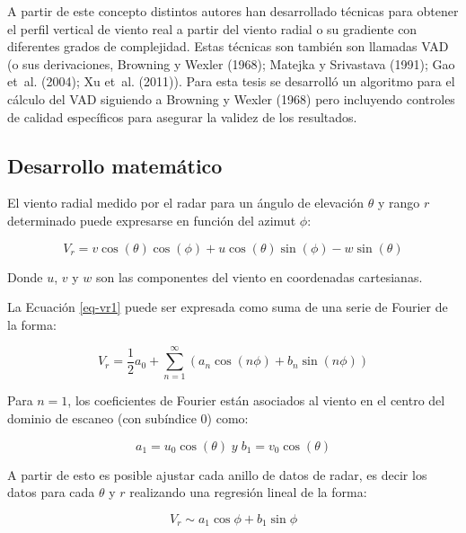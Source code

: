 \documentclass[12pt,spanish,oneside]{book}
\begin{document}
A partir de este concepto distintos autores han desarrollado técnicas
para obtener el perfil vertical de viento real a partir del viento
radial o su gradiente con diferentes grados de complejidad. Estas
técnicas son también son llamadas VAD (o sus derivaciones, Browning y
Wexler (1968); Matejka y Srivastava (1991); Gao et~al. (2004); Xu et~al.
(2011)). Para esta tesis se desarrolló un algoritmo para el cálculo del
VAD siguiendo a Browning y Wexler (1968) pero incluyendo controles de
calidad específicos para asegurar la validez de los resultados.

\subsection{Desarrollo matemático}\label{desarrollo-matematico}

El viento radial medido por el radar para un ángulo de elevación
\(\theta\) y rango \(r\) determinado puede expresarse en función del
azimut \(\phi\):

\begin{equation}
\label{eq-vr1}
V_r =  v \cos(\theta) \cos(\phi) + u \cos(\theta) \sin(\phi) - w \sin(\theta)
\end{equation}

Donde \(u\), \(v\) y \(w\) son las componentes del viento en coordenadas
cartesianas.

La Ecuación \ref{eq-vr1} puede ser expresada como suma de una serie de
Fourier de la forma:

\begin{equation}
\label{eq-vr2}
V_r =  \frac{1}{2}a_0 + \sum_{n = 1}^{\infty} (a_n \cos(n\phi) + b_n \sin(n \phi)) 
\end{equation}

Para \(n=1\), los coeficientes de Fourier están asociados al viento en
el centro del dominio de escaneo (con subíndice 0) como:

\begin{equation} \label{eq-vr3}
a_1 = u_0 \cos(\theta) \; y \;
b_1 = v_0 \cos(\theta) 
\end{equation}

A partir de esto es posible ajustar cada anillo de datos de radar, es
decir los datos para cada \(\theta\) y \(r\) realizando una regresión
lineal de la forma:

\begin{equation}
\label{eq-vr4}
V_r \sim a_1\cos \phi + b_1 \sin \phi
\end{equation}
\end{document}
